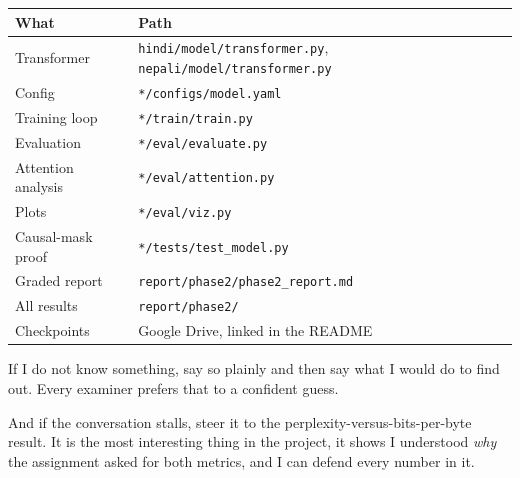 \documentclass[11pt]{report}
\newcommand{\p}[1]{\texttt{#1}}
\begin{document}
\begin{center}
\begin{tabular}{ll}
\toprule
What & Path \\
\midrule
Transformer & \p{hindi/model/transformer.py}, \p{nepali/model/transformer.py} \\
Config & \p{*/configs/model.yaml} \\
Training loop & \p{*/train/train.py} \\
Evaluation & \p{*/eval/evaluate.py} \\
Attention analysis & \p{*/eval/attention.py} \\
Plots & \p{*/eval/viz.py} \\
Causal-mask proof & \p{*/tests/test\_model.py} \\
Graded report & \p{report/phase2/phase2\_report.md} \\
All results & \p{report/phase2/} \\
Checkpoints & Google Drive, linked in the README \\
\bottomrule
\end{tabular}
\end{center}

\begin{notebox}
If I do not know something, say so plainly and then say what I would do to find
out. Every examiner prefers that to a confident guess.

And if the conversation stalls, steer it to the perplexity-versus-bits-per-byte
result. It is the most interesting thing in the project, it shows I understood
\emph{why} the assignment asked for both metrics, and I can defend every number in
it.
\end{notebox}
\end{document}
